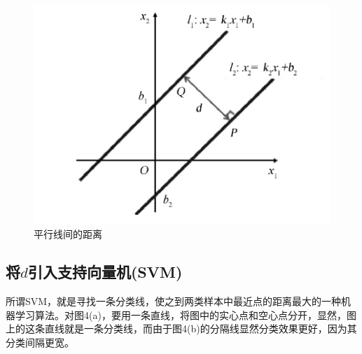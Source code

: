 \documentclass[12pt,a4paper]{article}%
\begin{document}
	\begin{figure}[H]%
		\centering
		\begin{minipage}{0.6\textwidth}%
			\centering
			\includegraphics[width=0.8%
			\textwidth]{figure4}%
			\caption{\fontsize{10pt}{15pt}\selectfont 平行线间的距离}%
		\end{minipage}
	\end{figure}
	
	\subsection{将$d$引入支持向量机(SVM)}
	所谓SVM，就是寻找一条分类线，使之到两类样本中最近点的距离最大的一种机器学习算法。对图4(a)，要用一条直线，将图中的实心点和空心点分开，显然，图上的这条直线就是一条分类线，而由于图4(b)的分隔线显然分类效果更好，因为其分类间隔更宽。
	
\end{document}
